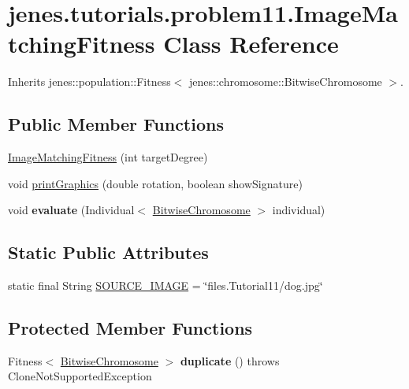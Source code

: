 \hypertarget{classjenes_1_1tutorials_1_1problem11_1_1_image_matching_fitness}{
\section{jenes.tutorials.problem11.ImageMatchingFitness Class Reference}
\label{classjenes_1_1tutorials_1_1problem11_1_1_image_matching_fitness}
}
Inherits jenes::population::Fitness$<$ jenes::chromosome::BitwiseChromosome $>$.

\subsection*{Public Member Functions}
\begin{CompactItemize}
\item 
\hyperlink{classjenes_1_1tutorials_1_1problem11_1_1_image_matching_fitness_b2d23d7e2f9d4cbb57d5818dbcf91e05}{ImageMatchingFitness} (int targetDegree)
\item 
void \hyperlink{classjenes_1_1tutorials_1_1problem11_1_1_image_matching_fitness_57d1723f3fea82e96455935aefb360b9}{printGraphics} (double rotation, boolean showSignature)
\item 
\hypertarget{classjenes_1_1tutorials_1_1problem11_1_1_image_matching_fitness_d1678b0716a862654451a29b12964ec1}{
void \textbf{evaluate} (Individual$<$ \hyperlink{classjenes_1_1chromosome_1_1_bitwise_chromosome}{BitwiseChromosome} $>$ individual)}
\label{classjenes_1_1tutorials_1_1problem11_1_1_image_matching_fitness_d1678b0716a862654451a29b12964ec1}

\end{CompactItemize}
\subsection*{Static Public Attributes}
\begin{CompactItemize}
\item 
static final String \hyperlink{classjenes_1_1tutorials_1_1problem11_1_1_image_matching_fitness_bcca6e100ede27ef9a90ddbc35497efd}{SOURCE\_\-IMAGE} = \char`\"{}files.Tutorial11/dog.jpg\char`\"{}
\end{CompactItemize}
\subsection*{Protected Member Functions}
\begin{CompactItemize}
\item 
\hypertarget{classjenes_1_1tutorials_1_1problem11_1_1_image_matching_fitness_c56d86ab7d7c270c284ea8745b53d0b6}{
Fitness$<$ \hyperlink{classjenes_1_1chromosome_1_1_bitwise_chromosome}{BitwiseChromosome} $>$ \textbf{duplicate} ()  throws CloneNotSupportedException }
\label{classjenes_1_1tutorials_1_1problem11_1_1_image_matching_fitness_c56d86ab7d7c270c284ea8745b53d0b6}

\end{CompactItemize}


